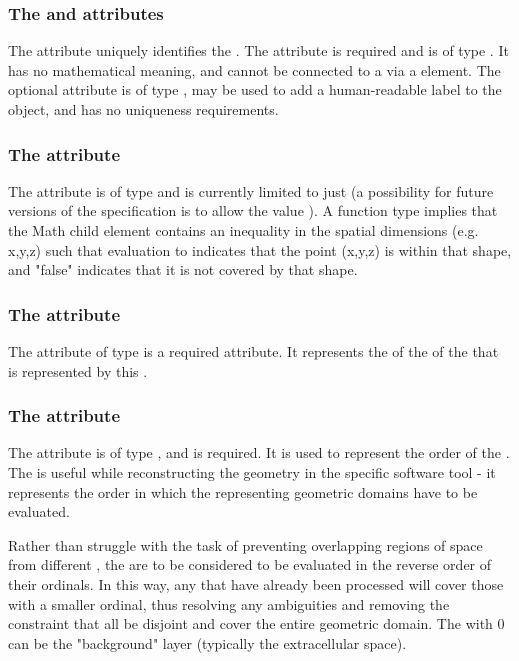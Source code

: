 \subsubsection{The \fixttspace{} and \fixttspace{} attributes}
The  attribute uniquely identifies the \AnalyticVolume. The attribute is required and is of type .  It has no mathematical meaning, and cannot be connected to a \Parameter via a \SpatialSymbolReference element.  The optional  attribute is of type , may be used to add a human-readable label to the object, and has no uniqueness requirements.

\subsubsection{The \fixttspace{} attribute}
The  attribute is of type  and is currently limited to just  (a possibility for future versions of the specification is to allow the value ).  A  function type implies that the Math child element contains an inequality in the spatial dimensions (e.g. x,y,z) such that evaluation to  indicates that the point (x,y,z) is within that shape, and "false" indicates that it is not covered by that shape.

\subsubsection{The \fixttspace{} attribute}
The  attribute of type  is a required attribute. It represents the  of the \DomainType of the \Domain that is represented by this \AnalyticVolume. 

\subsubsection{The \fixttspace{} attribute}
The  attribute is of type , and is required. It is used to represent the order of the \AnalyticVolume. The  is useful while reconstructing the geometry in the specific software tool - it represents the order in which the \AnalyticVolumes representing geometric domains have to be evaluated.

Rather than struggle with the task of preventing overlapping regions of space from different \AnalyticVolumes, the \AnalyticVolumes are to be considered to be evaluated in the reverse order of their ordinals.  In this way, any \AnalyticVolumes that have already been processed will cover those with a smaller ordinal, thus resolving any ambiguities and removing the constraint that all \AnalyticVolumes be disjoint and cover the entire geometric domain.  The \AnalyticVolume with  0 can be the "background" layer (typically the extracellular space).  

